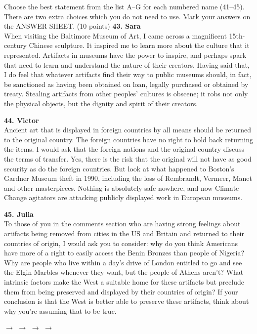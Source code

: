 \documentclass[12pt,a4paper]{article}
\begin{document}
\begin{partb}{
Choose the best statement from the list A--G for each numbered name (41--45). There are two extra choices which you do not need to use. Mark your answers on the ANSWER SHEET. (10 points)
}
\vspace{0.8em}
\noindent\textbf{43. Sara}\\
When visiting the Baltimore Museum of Art, I came across a magnificent 15th-century Chinese sculpture. It inspired me to learn more about the culture that it represented. Artifacts in museums have the power to inspire, and perhaps spark that need to learn and understand the nature of their creators. Having said that, I do feel that whatever artifacts find their way to public museums should, in fact, be sanctioned as having been obtained on loan, legally purchased or obtained by treaty. Stealing artifacts from other peoples' cultures is obscene; it robs not only the physical objects, but the dignity and spirit of their creators.

\vspace{0.8em}
\noindent\textbf{44. Victor}\\
Ancient art that is displayed in foreign countries by all means should be returned to the original country. The foreign countries have no right to hold back returning the items. I would ask that the foreign nations and the original country discuss the terms of transfer. Yes, there is the risk that the original will not have as good security as do the foreign countries. But look at what happened to Boston's Gardner Museum theft in 1990, including the loss of Rembrandt, Vermeer, Manet and other masterpieces. Nothing is absolutely safe nowhere, and now Climate Change agitators are attacking publicly displayed work in European museums.

\vspace{0.8em}
\noindent\textbf{45. Julia}\\
To those of you in the comments section who are having strong feelings about artifacts being removed from cities in the US and Britain and returned to their countries of origin, I would ask you to consider: why do you think Americans have more of a right to easily access the Benin Bronzes than people of Nigeria? Why are people who live within a day's drive of London entitled to go and see the Elgin Marbles whenever they want, but the people of Athens aren't? What intrinsic factors make the West a suitable home for these artifacts but preclude them from being preserved and displayed by their countries of origin? If your conclusion is that the West is better able to preserve these artifacts, think about why you're assuming that to be true.

\vspace{1em}
 $\rightarrow$  $\rightarrow$  $\rightarrow$  $\rightarrow$ 
\end{partb}
\end{document}

